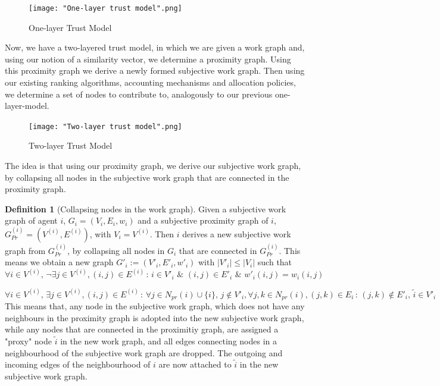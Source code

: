 \documentclass[11pt,a4paper]{report}
\theoremstyle{definition}
\newtheorem{definition}{Definition}[section]
\theoremstyle{theorem}
\theoremstyle{proposition}
\theoremstyle{corollary}
\theoremstyle{lemma}
\theoremstyle{example}
\theoremstyle{remark}
\begin{document}
\begin{figure}[H]
\begin{center}
\texttt{[image: "One-layer trust model".png]}
\caption{One-layer Trust Model}
\label{fig:One-layer trust model}
\end{center}
\end{figure}

\noindent{}Now, we have a two-layered trust model, in which we are given a work graph and, using our notion of a similarity vector, we determine a proximity graph. Using this proximity graph we derive a newly formed subjective work graph. Then using our existing ranking algorithms, accounting mechanisms and allocation policies, we determine a set of nodes to contribute to, analogously to our previous one-layer-model. \vspace{1em}\\

\begin{figure}[H]
\texttt{[image: "Two-layer trust model".png]}
\caption{Two-layer Trust Model}
\label{fig:Two-layer trust model}
\end{figure}
\noindent{}The idea is that using our proximity graph, we derive our subjective work graph, by collapsing all nodes in the subjective work graph that are connected in the proximity graph. \vspace{1em}\\
\newpage
\begin{definition}[Collapsing nodes in the work graph]
Given a subjective work graph of agent $i$, $G_i=(V_i,E_i,w_i)$ and a subjective proximity graph of $i$, $G^{(i)}_{Pr}=(V^{(i)}, E^{(i)})$, with $V_i=V^{(i)}$. Then $i$ derives a new subjective work graph from $G^{(i)}_{Pr}$, by collapsing all nodes in $G_i$ that are connected in $G^{(i)}_{Pr}$. This means we obtain a new graph $G'_i:=(V'_i, E'_i, w'_i)$ with $|V'_i|\leq{}|V_i|$ such that 
\[
\forall{}i\in{}V^{(i)},\,\neg\exists{}j\in{}V^{(i)},(i,j)\in{}E^{(i)}\,:\,i\in{}V'_i\,\,\&\,\,(i,j)\in{}E'_i\,\,\&\,\,w'_i(i,j)=w_i(i,j) 
\]

\[
\forall{}i\in{}V^{(i)},\,\exists{}j\in{}V^{(i)},(i,j)\in{}E^{(i)}\,:\,\forall{}j\in{}N_{pr}(i)\cup{}\lbrace{}i\rbrace,\,j\not\in{}V'_i,\forall{}j,k\in{}N_{pr}(i), (j,k)\in{}E_i\,:\,(j,k)\not\in{}E'_i,\,\tilde{i}\in{}V'_i 
\]
This means that, any node in the subjective work graph, which does not have any neighbours in the proximity graph is adopted into the new subjective work graph, while any nodes that are connected in the proximitiy graph, are assigned a "proxy" node $\tilde{i}$ in the new work graph, and all edges connecting nodes in a neighbourhood of the subjective work graph are dropped. The outgoing and incoming edges of the neighbourhood of $i$ are now attached to $\tilde{i}$ in the new subjective work graph. \vspace{1em}\\
\end{definition}
\end{document}
